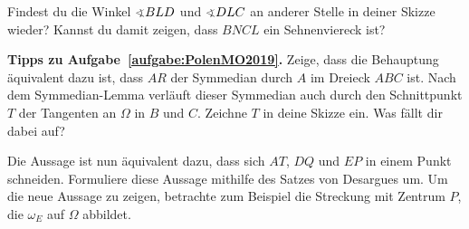 Findest du die Winkel $\winkel BLD$ und $\winkel DLC$ an anderer Stelle in deiner Skizze wieder? Kannst du damit zeigen, dass $BNCL$ ein Sehnenviereck ist?

\textbf{Tipps zu Aufgabe~\ref{aufgabe:PolenMO2019}.} Zeige, dass die Behauptung äquivalent dazu ist, dass $AR$ der Symmedian durch $A$ im Dreieck $ABC$ ist. Nach dem Symmedian-Lemma verläuft dieser Symmedian auch durch den Schnittpunkt $T$ der Tangenten an $\Omega$ in $B$ und $C$. Zeichne $T$ in deine Skizze ein. Was fällt dir dabei auf?

Die Aussage ist nun äquivalent dazu, dass sich $AT$, $DQ$ und $EP$ in einem Punkt schneiden. Formuliere diese Aussage mithilfe des Satzes von Desargues um. Um die neue Aussage zu zeigen, betrachte zum Beispiel die Streckung mit Zentrum $P$, die $\omega_E$ auf $\Omega$ abbildet.